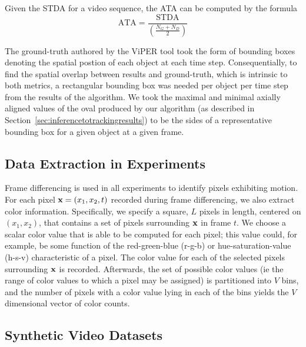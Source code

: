 \documentclass[twocolumn, final]{svjour3}
\begin{document}
Given the STDA for a video sequence, the ATA can be computed by the formula
\begin{equation}
\text{ATA} = \frac{\text{STDA}}{\left( \frac{N_{G} + N_{D}}{2} \right)}
\end{equation}

The ground-truth authored by the ViPER tool took the form of bounding boxes denoting the spatial postion of each object at each time step. Consequentially, to find the spatial overlap between results and ground-truth, which is intrinsic to both metrics, a rectangular bounding box was needed per object per time step from the results of the algorithm. We took the maximal and minimal axially aligned values of the oval produced by our algorithm (as described in Section~\ref{sec:inferencetotrackingresults}) to be the sides of a representative bounding box for a given object at a given frame.



\subsection{Data Extraction in Experiments}
\label{sec:dataextractioninexperiments}

Frame differencing is used in all experiments to identify pixels exhibiting motion. 
For each pixel $\bold{x} = ( x_{1}, x_{2}, t )$ recorded during frame differencing, we also extract color information. Specifically, we specify a square, $L$ pixels in length, centered on $(x_{1}, x_{2})$, that contains a set of pixels surrounding $\bold{x}$ in frame $t$. We choose a scalar color value that is able to be computed for each pixel; this value could, for example, be some function of the red-green-blue (r-g-b) or hue-saturation-value (h-s-v) characteristic of a pixel. The color value for each of the selected pixels surrounding $\bold{x}$ is recorded. Afterwards, the set of possible color values (ie the range of color values to which a pixel may be assigned) is partitioned into $V$ bins, and the number of pixels with a color value lying in each of the bins yields the $V$ dimensional vector of color counts.



\subsection{Synthetic Video Datasets}
\label{sec:syntheticvideodatasets}
\end{document}
